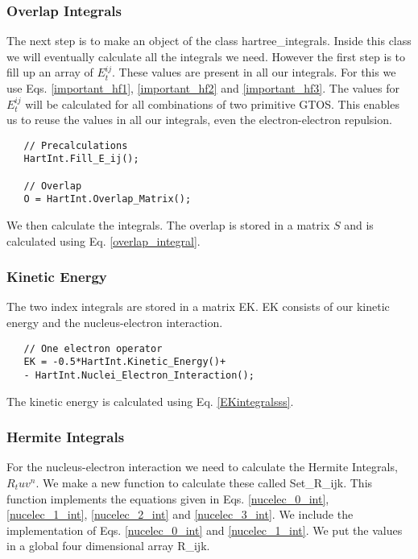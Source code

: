 \documentclass[a4paper,norsk,11pt,twoside]{report}
\begin{document}
\subsubsection{Overlap Integrals}
The next step is to make an object of the class
hartree\_integrals. Inside this class we will eventually calculate all
the integrals we need. However the first step is to fill up an array
of $E_t^{ij}$. These values are present in all our integrals. For this
we use Eqs. \eqref{important_hf1}, \eqref{important_hf2} and
\eqref{important_hf3}. The values for $E_t^{ij}$ will be calculated
for all combinations of two primitive GTOS. This enables us to reuse
the values in all our integrals, even the electron-electron
repulsion. \\

\begin{lstlisting}
   // Precalculations
   HartInt.Fill_E_ij();

   // Overlap
   O = HartInt.Overlap_Matrix();
\end{lstlisting}

We then calculate the integrals. The overlap is stored in a matrix $S$
and is calculated using Eq. \eqref{overlap_integral}. \\

\subsubsection{Kinetic Energy}
The two index integrals are stored in a matrix EK. EK consists of our
kinetic energy and the nucleus-electron interaction. \\

\begin{lstlisting}
   // One electron operator
   EK = -0.5*HartInt.Kinetic_Energy()+
   - HartInt.Nuclei_Electron_Interaction();
\end{lstlisting}

The kinetic energy is calculated using Eq. \eqref{EKintegralsss}. \\

\subsubsection{Hermite Integrals}
For the nucleus-electron interaction we need to calculate the Hermite
Integrals, $R_tuv^n$. We make a new function to calculate these called
Set\_R\_ijk. This function implements the equations given in
Eqs. \eqref{nucelec_0_int}, \eqref{nucelec_1_int},
\eqref{nucelec_2_int} and \eqref{nucelec_3_int}. We include the
implementation of Eqs. \eqref{nucelec_0_int} and
\eqref{nucelec_1_int}. We put the values in a global four dimensional
array R\_ijk.
\end{document}
